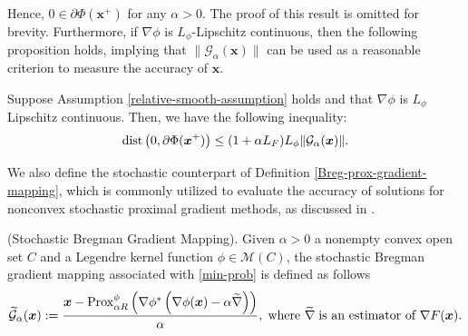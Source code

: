 \documentclass[twoside,11pt]{article}
\newcommand{\cG}{\mathcal G}
\newcommand{\cM}{\mathcal M}
\def\vx{{\bm{x}}}
\begin{document}
{Hence,} $0 \in \partial\Phi(\vx^+)$ for any $\alpha > 0$. 
The proof of this result is omitted for brevity. Furthermore, if $\nabla\phi$ is $L_\phi$-Lipschitz continuous, then the following proposition holds, implying that $\|\cG_\alpha(\vx)\|$ can be used as a reasonable criterion {to measure the accuracy of $\vx$.}
\begin{proposition}
\label{prop-Bregman-mapping-subdifferential}
Suppose Assumption \ref{relative-smooth-assumption} holds and that $\nabla\phi$ is $L_\phi$ Lipschitz continuous. Then, we have the following inequality:
\[
{\rm dist}\left(0,\partial\Phi({\vx^+})\right)\leq(1+\alpha L_F)L_\phi\|\cG_\alpha(\vx)\|.
\]
\end{proposition}
 We also define the stochastic counterpart of Definition \ref{Breg-prox-gradient-mapping}, which is commonly utilized to evaluate the accuracy of solutions for nonconvex stochastic proximal gradient methods, as discussed in \citep{ghadimi2016mini}.
\begin{definition}\label{stoc-Bregman-grad-map}
(Stochastic Bregman Gradient Mapping).
Given $\alpha>0$ a nonempty convex open set $C$ and a Legendre kernel function $\phi\in\cM(C)$, the stochastic Bregman gradient mapping associated with \eqref{min-prob} is defined as follows
 \[
 \widetilde{\mathcal G}_{\alpha}({\vx}):=\frac{{\vx}-{\rm Prox}^\phi_{\alpha R}\left(\nabla\phi^*\left(\nabla\phi({\vx})-\alpha\widetilde\nabla\right)\right)}{\alpha},\;\text{where }\widetilde{\nabla}\;\text{is an estimator of }\nabla F(\vx).
 \]   
\end{definition}
\end{document}
